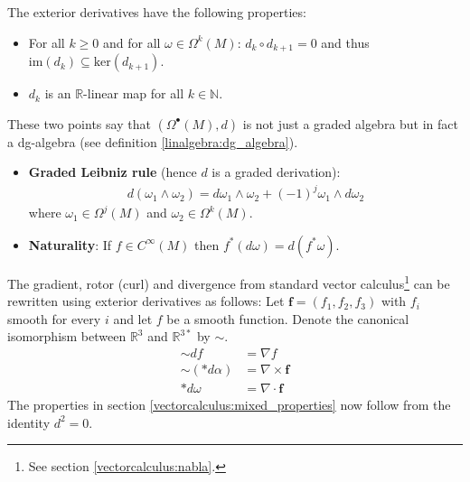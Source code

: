     \begin{property}\label{forms:exterior_derivative_properties}
        The exterior derivatives have the following properties:
        \begin{itemize}
            \item For all $k\geq 0$ and for all $\omega\in\Omega^k(M)$: $d_k\circ d_{k+1} = 0$ and thus $\text{im}(d_k)\subseteq\text{ker}(d_{k+1})$.
            \item $d_k$ is an $\mathbb{R}$-linear map for all $k\in\mathbb{N}$.
        \end{itemize}
        These two points say that $(\Omega^\bullet(M),d)$ is not just a graded algebra but in fact a dg-algebra (see definition \ref{linalgebra:dg_algebra}).
        \begin{itemize}
            \item \textbf{Graded Leibniz rule} (hence $d$ is a graded derivation):
                \begin{gather}
                    d(\omega_1\wedge\omega_2) = d\omega_1\wedge\omega_2 + (-1)^j\omega_1\wedge d\omega_2
                \end{gather}
                where $\omega_1\in\Omega^j(M)$ and $\omega_2\in\Omega^k(M)$.
            \item \textbf{Naturality}: If $f\in C^\infty(M)$ then $f^*(d\omega) = d(f^*\omega)$.
        \end{itemize}
    \end{property}

    \begin{remark}[$\dag$]\label{forms:vector_calculus}
        The gradient, rotor (curl) and divergence from standard vector calculus\footnote{See section \ref{vectorcalculus:nabla}.} can be rewritten using exterior derivatives as follows: Let $\mathbf{f} = (f_1, f_2, f_3)$ with $f_i$ smooth for every $i$ and let $f$ be a smooth function. Denote the canonical isomorphism between $\mathbb{R}^3$ and $\mathbb{R}^{3*}$ by $\sim$.
        \begin{align}
            \sim df &= \nabla f \\
            \sim (\ast d\alpha) &= \nabla\times\mathbf{f} \\
            \ast d\omega &= \nabla\cdot\mathbf{f}
        \end{align}
        The properties in section \ref{vectorcalculus:mixed_properties} now follow from the identity $d^2 = 0$.
    \end{remark}

